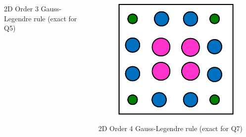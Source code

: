 \documentclass[8pt,xcolor=svgnames]{beamer}
\begin{document}
\begin{frame}
\begin{columns}[T]
\begin{column}{0.2\textwidth}
\begin{figure}[h!]
      \end{figure}
      \centering
      \tiny{2D Order 3
	Gauss-Legendre rule
	(exact for Q5)}
  \end{column}
  \begin{column}{0.2\textwidth}
    \begin{figure}[h!]
      \centering
      \includegraphics[width=1.0\textwidth,keepaspectratio=true]{./Images/quad4.png}
      \end{figure}
      \centering
      \tiny{2D Order 4
	Gauss-Legendre rule
	(exact for Q7)}
  \end{column}
  \end{columns}
\end{frame}
\end{document}
